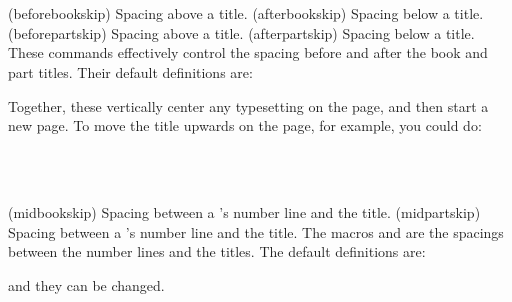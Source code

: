 \begin{syntax}
\cmd{\beforebookskip} \cmd{\afterbookskip} \\
\cmd{\beforepartskip} \cmd{\afterpartskip} \\
\end{syntax}
\glossary(beforebookskip)%
  {}%
  {Spacing above a  title.}
\glossary(afterbookskip)%
  {}%
  {Spacing below a  title.}
\glossary(beforepartskip)%
  {}%
  {Spacing above a  title.}
\glossary(afterpartskip)%
  {}%
  {Spacing below a  title.}
These commands effectively control the spacing before and after the book
and  part titles. Their default definitions are:
\begin{lcode}
\newcommand*{\beforebookskip}{\null\vfil}
\newcommand*{\afterbookskip}{\vfil\newpage}
\newcommand*{\beforepartskip}{\null\vfil}
\newcommand*{\afterpartskip}{\vfil\newpage}
\end{lcode}
Together, these vertically center any typesetting on the page, and then start
a new page. To move the  title upwards on the page, for example, 
you could do:
\begin{lcode}
\renewcommand*{\beforepartskip}{\null\vskip 0pt plus 0.3fil}
\renewcommand*{\afterpartskip}{\vskip 0pt plus 0.7fil \newpage}
\end{lcode} 

\begin{syntax}
\cmd{\midbookskip} \\
\cmd{\midpartskip} \\
\end{syntax}
\glossary(midbookskip)%
  {}%
  {Spacing between a 's number line and the title.}
\glossary(midpartskip)%
  {}%
  {Spacing between a 's number line and the title.}
The macros \cmd{\midbookskip} and \cmd{\midpartskip} are the spacings
between the number lines and the titles. The default definitions are:
\begin{lcode}
\newcommand{\midbookskip}{\par\vspace 2\onelineskip}
\newcommand{\midpartskip}{\par\vspace 2\onelineskip}
\end{lcode}
and they can be changed.

